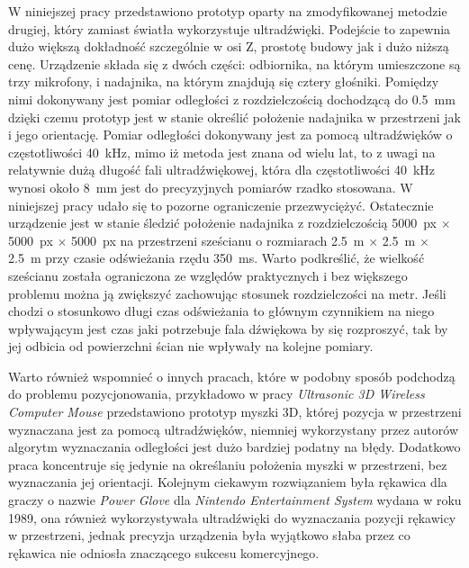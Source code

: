  W niniejszej pracy przedstawiono prototyp oparty na zmodyfikowanej metodzie drugiej, który zamiast światła wykorzystuje ultradźwięki. 
 Podejście to zapewnia dużo większą dokładność szczególnie w osi Z, prostotę budowy jak i dużo niższą cenę.
 Urządzenie składa się z dwóch części: odbiornika, na którym umieszczone są trzy mikrofony, i nadajnika,
 na którym znajdują się cztery głośniki. Pomiędzy nimi dokonywany jest pomiar odległości z rozdzielczością
 dochodzącą do \SI{0,5}{mm} dzięki czemu prototyp jest w stanie określić położenie nadajnika
w przestrzeni jak i jego orientację. 
Pomiar odległości dokonywany jest za pomocą ultradźwięków o częstotliwości \SI{40}{kHz},
mimo iż metoda jest znana od wielu lat, to z uwagi na relatywnie dużą długość fali ultradźwiękowej,
która dla częstotliwości \SI{40}{kHz} wynosi około \SI{8}{mm} jest do precyzyjnych pomiarów rzadko stosowana.
W niniejszej pracy udało się to pozorne ograniczenie przezwyciężyć.
Ostatecznie urządzenie jest w stanie śledzić położenie nadajnika z rozdzielczością 
\SI{5000}{px} $\times$ \SI{5000}{px} $\times$ \SI{5000}{px} na przestrzeni sześcianu o rozmiarach 
\SI{2,5}{m} $\times$ \SI{2,5}{m}  $\times$ \SI{2,5}{m} przy czasie odświeżania rzędu \SI{350}{ms}.
Warto podkreślić, że wielkość sześcianu została ograniczona ze względów praktycznych i bez 
większego problemu można ją zwiększyć zachowując stosunek rozdzielczości na metr.
Jeśli chodzi o stosunkowo długi czas odświeżania to
 głównym czynnikiem na niego wpływającym jest czas jaki potrzebuje fala dźwiękowa by się rozproszyć,
 tak by jej odbicia od powierzchni ścian nie wpływały na kolejne pomiary.

Warto również wspomnieć o innych pracach, które w podobny sposób podchodzą do problemu pozycjonowania, przykładowo 
w pracy \textit{Ultrasonic 3D Wireless Computer Mouse} \cite{bib:mouse} przedstawiono prototyp myszki 3D, której
pozycja w przestrzeni wyznaczana jest za pomocą ultradźwięków, niemniej wykorzystany przez autorów algorytm wyznaczania 
odległości jest dużo bardziej podatny na błędy. Dodatkowo praca koncentruje się jedynie
na określaniu położenia myszki w przestrzeni, bez wyznaczania jej orientacji.
Kolejnym ciekawym rozwiązaniem była rękawica dla graczy o nazwie \textit{Power Glove} \cite{bib:powerGlove} \cite{bib:powerGlove2} dla
\textit{Nintendo Entertainment System} wydana w roku 1989, ona również wykorzystywała ultradźwięki do wyznaczania pozycji
rękawicy w przestrzeni, jednak precyzja urządzenia była wyjątkowo słaba przez co rękawica nie odniosła znaczącego sukcesu komercyjnego.


